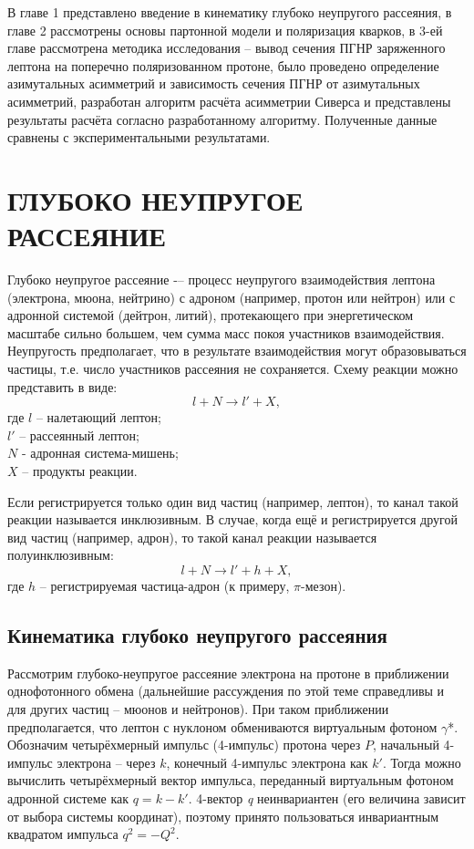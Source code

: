 \documentclass{extreport}
\begin{document}
В главе 1 представлено введение в кинематику глубоко неупругого рассеяния, в главе 2 рассмотрены основы партонной модели и поляризация кварков, в 3-ей главе рассмотрена методика исследования -- вывод сечения ПГНР заряженного лептона на поперечно поляризованном протоне, было проведено определение азимутальных асимметрий и зависимость сечения ПГНР от азимутальных асимметрий, разработан алгоритм расчёта асимметрии Сиверса и представлены результаты расчёта согласно разработанному алгоритму. Полученные данные сравнены с экспериментальными результатами.

\newpage
\chapter{\MakeUppercase{Глубоко неупругое рассеяние}} 
\thispagestyle{myheadings}
Глубоко неупругое рассеяние -– процесс неупругого взаимодействия лептона (электрона, мюона, нейтрино) с адроном (например, протон или нейтрон) или с адронной системой (дейтрон, литий), протекающего при энергетическом масштабе сильно большем, чем сумма масс покоя участников взаимодействия. Неупругость предполагает, что в результате взаимодействия могут образовываться частицы, т.е. число участников рассеяния не сохраняется. Схему реакции можно представить в виде:
\begin{equation}
	l + N \rightarrow l' + X,
\end{equation}
где $l$ -- налетающий лептон; \\ $l'$ -- рассеянный лептон; \\ $N$ - адронная система-мишень; \\ $X$ -- продукты реакции. 

Если регистрируется только один вид частиц (например, лептон), то канал такой реакции называется инклюзивным. В случае, когда ещё и регистрируется другой вид частиц (например, адрон), то такой канал реакции называется полуинклюзивным:
\begin{equation}
	l + N \rightarrow l' + h + X,
\end{equation}
где $h$ -- регистрируемая частица-адрон (к примеру, $\pi$-мезон). 
\section{Кинематика глубоко неупругого рассеяния}
Рассмотрим глубоко-неупругое рассеяние электрона на протоне в приближении однофотонного обмена (дальнейшие рассуждения по этой теме справедливы и для других частиц – мюонов и нейтронов). При таком приближении предполагается, что лептон с нуклоном обмениваются виртуальным фотоном $\gamma$*. Обозначим четырёхмерный импульс (4-импульс) протона через $P$, начальный 4-импульс электрона – через $k$,  конечный 4-импульс электрона как $k'$. Тогда можно вычислить четырёхмерный вектор импульса, переданный виртуальным фотоном адронной системе как $q=k-k'$. 4-вектор \textit{q} неинвариантен (его величина зависит от выбора системы координат), поэтому принято пользоваться инвариантным квадратом импульса $q^2=-Q^2$.
\end{document}
